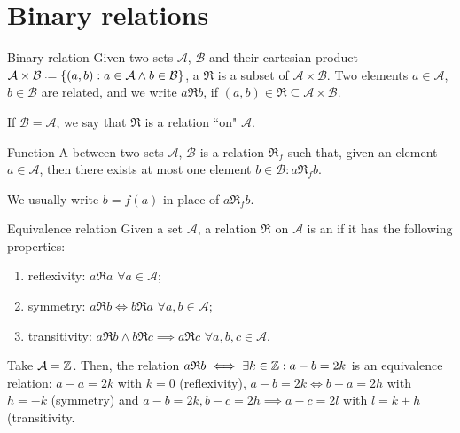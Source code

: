 
\section{Binary relations}

\begin{definition}{Binary relation}{}
  Given two sets $ \mathcal{A} $, $ \mathcal{B} $ and their cartesian product $ \mathcal{A} \times \mathcal{B} \defeq \{(a,b) : a \in \mathcal{A} \land b \in \mathcal{B}\} $, a  $ \mathfrak{R} $ is a subset of $ \mathcal{A} \times \mathcal{B} $. Two elements $ a \in \mathcal{A} $, $ b \in \mathcal{B} $ are related, and we write $ a \mathfrak{R} b $, if $ (a,b) \in \mathfrak{R} \subseteq \mathcal{A} \times \mathcal{B} $.
\end{definition}

If $ \mathcal{B} = \mathcal{A} $, we say that $ \mathfrak{R} $ is a relation ``on" $ \mathcal{A} $.

\begin{definition}{Function}{}
  A  between two sets $ \mathcal{A} $, $ \mathcal{B} $ is a relation $ \mathfrak{R}_f $ such that, given an element $ a \in \mathcal{A} $, then there exists at most one element $ b \in \mathcal{B} : a \mathfrak{R}_f b $.
\end{definition}

We usually write $ b = f(a) $ in place of $ a \mathfrak{R}_f b $.

\begin{definition}{Equivalence relation}{}
  Given a set $ \mathcal{A} $, a relation $ \mathfrak{R} $ on $ \mathcal{A} $ is an  if it has the following properties:
  \begin{enumerate}
    \item reflexivity: $ a \mathfrak{R} a \,\,\forall a \in \mathcal{A} $;
    \item symmetry: $ a \mathfrak{R} b \iff b \mathfrak{R} a \,\,\forall a,b \in \mathcal{A} $;
    \item transitivity: $ a \mathfrak{R} b \land b \mathfrak{R} c \implies a \mathfrak{R} c \,\,\forall a,b,c \in \mathcal{A} $.
  \end{enumerate}
\end{definition}

\begin{example}{}{}
  Take $ \mathcal{A} = \mathbb{Z} $. Then, the relation $ a \mathfrak{R} b \iff \exists k \in \mathbb{Z} : a - b = 2k $ is an equivalence relation: $ a - a = 2k $ with $ k = 0 $ (reflexivity), $ a - b = 2k \iff b - a = 2h $ with $ h = -k $ (symmetry) and $ a - b = 2k , b - c = 2h \implies a - c = 2l $ with $ l = k + h $ (transitivity.
\end{example}

